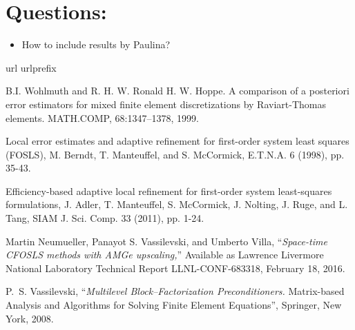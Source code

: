 \documentclass[a4paper,12pt]{amsart}
\numberwithin{equation}{section}
\begin{document}
\section{Questions:}

\begin{itemize}
	\item How to include results by Paulina?
\end{itemize}


\begin{thebibliography}{99}
\expandafter\ifx\csname url\endcsname\relax
  \def\url#1{\texttt{#1}}\fi
\expandafter\ifx\csname urlprefix\endcsname\relax\def\urlprefix{URL }\fi

B.I. Wohlmuth and R. H. W. Ronald H. W. Hoppe. A comparison of a posteriori error estimators for mixed finite element discretizations by Raviart-Thomas elements. MATH.COMP, 68:1347–1378, 1999.

Local error estimates and adaptive refinement for first-order system least squares (FOSLS), M. Berndt, T. Manteuffel, and S. McCormick, E.T.N.A. 6 (1998), pp. 35-43.

Efficiency-based adaptive local refinement for first-order system least-squares formulations, J. Adler, T. Manteuffel, S. McCormick, J. Nolting, J. Ruge, and L. Tang, SIAM J. Sci. Comp. 33 (2011), pp. 1-24. 

Martin Neumueller, Panayot S. Vassilevski, and Umberto Villa,
``{\em Space-time CFOSLS methods with AMGe upscaling,}''
Available as Lawrence Livermore National Laboratory Technical Report LLNL-CONF-683318, February 18, 2016.


{\sc P.~S. Vassilevski,}
``{\em Multilevel Block--Factorization Preconditioners.} 
Matrix-based Analysis and Algorithms for Solving Finite Element Equations'',
Springer, New York, 2008.

\end{thebibliography}
\end{document}

